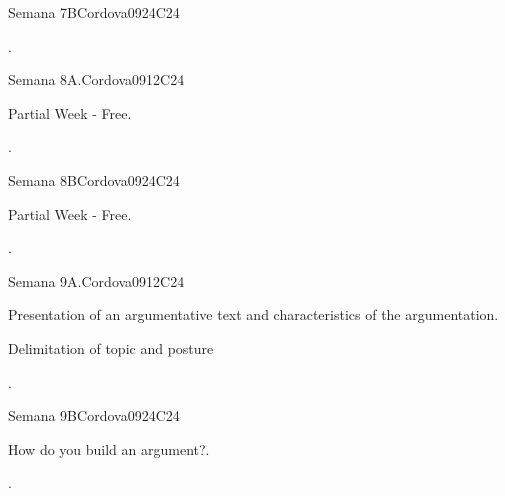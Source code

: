 \begin{syllabus}
\begin{unit}{Semana 7B}{}{Cordova09}{24}{C24}
   \begin{learningoutcomes}
      \item . 
      \end{learningoutcomes}
\end{unit}


\begin{unit}{Semana 8A.}{}{Cordova09}{12}{C24}
   \begin{topics}
      \item Partial Week - Free.
   \end{topics}
   \begin{learningoutcomes}
      \item .
   \end{learningoutcomes}
\end{unit}

\begin{unit}{Semana 8B}{}{Cordova09}{24}{C24}
   \begin{topics}
      \item Partial Week - Free.
   \end{topics}

   \begin{learningoutcomes}
      \item .
      \end{learningoutcomes}
\end{unit}


\begin{unit}{Semana 9A.}{}{Cordova09}{12}{C24}
   \begin{topics}
      \item Presentation of an argumentative text and characteristics of the argumentation.
      \item Delimitation of topic and posture

   \end{topics}
   \begin{learningoutcomes}
      \item .
   \end{learningoutcomes}
\end{unit}

\begin{unit}{Semana 9B}{}{Cordova09}{24}{C24}
   \begin{topics}
      \item How do you build an argument?.
   \end{topics}

   \begin{learningoutcomes}
      \item .
      \end{learningoutcomes}
\end{unit}



\end{syllabus}
